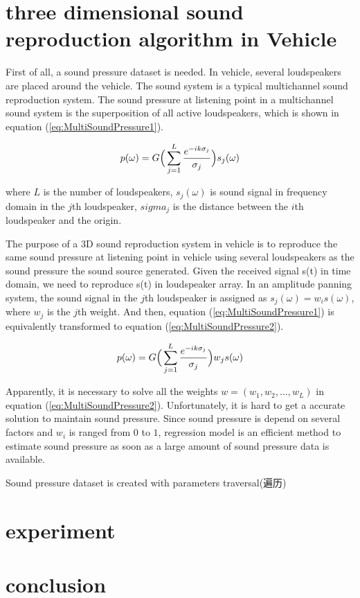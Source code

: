 \documentclass[runningheads,a4paper]{llncs}
\begin{document}
\section{three dimensional sound reproduction algorithm in Vehicle}\label{sec:algorithm}
First of all, a sound pressure dataset is needed. In vehicle, several loudspeakers are placed around the vehicle. The sound system is a typical multichannel sound reproduction system. The sound pressure at listening point in a multichannel sound system is the superposition of all active loudspeakers, which is shown in equation (\ref{eq:MultiSoundPressure1}).

\begin{equation}\label{eq:MultiSoundPressure1}
p(\omega)
=G\Big(\sum\limits^{L}_{j=1}\frac{e^{-ik\sigma_j}}{\sigma_j}\Big)s_j(\omega) \\
\end{equation}

where $L$ is the number of loudspeakers, $s_j(\omega)$ is sound signal in frequency domain in the $j$th loudspeaker, $sigma_j$ is the distance between the $i$th loudspeaker and the origin. 

The purpose of a 3D sound reproduction system in vehicle is to reproduce the same sound pressure at listening point in vehicle using several loudspeakers as the sound pressure the sound source generated. Given the received signal s(t) in time domain, we need to reproduce s(t) in loudspeaker array. In an amplitude panning system, the sound signal in the $j$th loudspeaker is assigned as $ s_j(\omega)=w_is(\omega)$, where $w_j$ is the $j$th weight. And then, equation (\ref{eq:MultiSoundPressure1}) is equivalently transformed to equation (\ref{eq:MultiSoundPressure2}).

\begin{equation}\label{eq:MultiSoundPressure2}
p(\omega)
=G\Big(\sum\limits^{L}_{j=1}\frac{e^{-ik\sigma_j}}{\sigma_j}\Big)w_js(\omega) \\
\end{equation}

Apparently, it is necessary to solve all the weights $w=(w_1,w_2,\dots,w_L)$ in equation (\ref{eq:MultiSoundPressure2}).  Unfortunately, it is hard to get a accurate solution to maintain sound pressure. Since sound pressure is depend on several factors and $w_i$ is ranged from $0$ to $1$, regression model is an efficient method to estimate sound pressure as soon as a large amount of sound pressure data is available.  

Sound pressure dataset is created with parameters 
traversal(遍历)


% 

\section{experiment}\label{sec:experiment}

\section{conclusion}\label{sec:conclusion}

\label{bib:bibliography}



\end{document}
